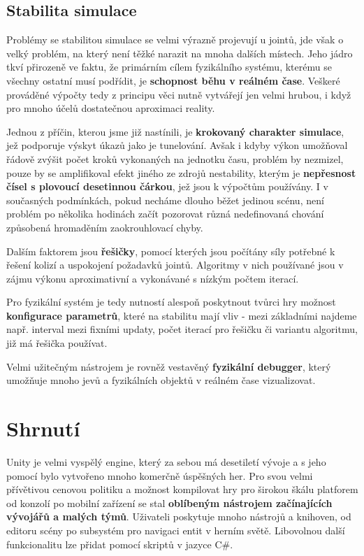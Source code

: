 \subsection{Stabilita simulace}

Problémy se stabilitou simulace se velmi výrazně projevují u jointů, jde však o velký problém, na který není těžké narazit na mnoha dalších místech. Jeho jádro tkví přirozeně ve faktu, že primárním cílem fyzikálního systému, kterému se všechny ostatní musí podřídit, je \textbf{schopnost běhu v reálném čase}. Veškeré prováděné výpočty tedy z principu věci nutně vytvářejí jen velmi hrubou, i když pro mnoho účelů dostatečnou aproximaci reality.

Jednou z příčin, kterou jsme již nastínili, je \textbf{krokovaný charakter simulace}, jež podporuje výskyt úkazů jako je tunelování. Avšak i kdyby výkon umožňoval řádově zvýšit počet kroků vykonaných na jednotku času, problém by nezmizel, pouze by se amplifikoval efekt jiného ze zdrojů nestability, kterým je \textbf{nepřesnost čísel s plovoucí desetinnou čárkou}, jež jsou k výpočtům používány. I v současných podmínkách, pokud necháme dlouho běžet jedinou scénu, není problém po několika hodinách začít pozorovat různá nedefinovaná chování způsobená hromaděním zaokrouhlovací chyby.   

Dalším faktorem jsou \textbf{řešičky}, pomocí kterých jsou počítány síly potřebné k řešení kolizí a uspokojení požadavků jointů. Algoritmy v nich používané jsou v zájmu výkonu aproximativní a vykonávané s nízkým počtem iterací.

Pro fyzikální systém je tedy nutností alespoň poskytnout tvůrci hry možnost \textbf{konfigurace parametrů}, které na stabilitu mají vliv - mezi základními najdeme např. interval mezi fixními updaty, počet iterací pro řešičku či variantu algoritmu, již má řešička používat.

Velmi užitečným nástrojem je rovněž vestavěný \textbf{fyzikální debugger}, který umožňuje mnoho jevů a fyzikálních objektů v reálném čase vizualizovat.



\section{Shrnutí}

Unity je velmi vyspělý engine, který za sebou má desetiletí vývoje a s jeho pomocí bylo vytvořeno mnoho komerčně úspěšných her. Pro svou velmi přívětivou cenovou politiku a možnost kompilovat hry pro širokou škálu platforem od konzolí po mobilní zařízení se stal \textbf{oblíbeným nástrojem začínajících vývojářů a malých týmů}. Uživateli poskytuje mnoho nástrojů a knihoven, od editoru scény po subsystém pro navigaci entit v herním světě. Libovolnou další funkcionalitu lze přidat pomocí skriptů v jazyce C\#. 

